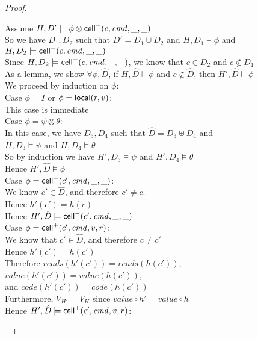 \begin{proof}
  \begin{tabbedproof}
    \oo Assume $H, D' \models \phi \otimes \mathsf{cell}^{-}({c}, {\mathit{cmd}}, {\_}, {\_})$. \\
    \ooo So we have $D_1, D_2$ such that $D' = D_1 \uplus D_2$ and $H, D_1 \models \phi$ and $H, D_2 \models \mathsf{cell}^{-}({c}, {\mathit{cmd}}, {\_}, {\_})$ \\
    \ooo Since $H, D_2 \models \mathsf{cell}^{-}({c}, {\mathit{cmd}}, {\_}, {\_})$, we know that $c \in D_2$ and $c \not\in D_1$ \\
    \ooo As a lemma, we show $\forall \phi, \hat{D}$, if $H, \hat{D} \models \phi$ and $c \not \in \hat{D}$, then $H', \hat{D} \models \phi$ \\
    \ooo We proceed by induction on $\phi$: \\
    \oooo Case $\phi = I$ or $\phi = \mathsf{local}({r}, {v})$: \\
    \ooooo This case is immediate \\
    \oooo Case $\phi = \psi \otimes \theta$: \\
    \ooooo In this case, we have $D_3, D_4$ such that $\hat{D} = D_3 \uplus D_4$ and  \\
    \ooooox $H, D_3 \models \psi$ and $H, D_4 \models \theta$ \\
    \ooooo So by induction we have $H', D_3 \models \psi$ and $H', D_4 \models \theta$ \\
    \ooooo Hence $H', \hat{D} \models \phi$\\
    \oooo Case $\phi = \mathsf{cell}^{-}({c'}, {\mathit{cmd}}, {\_}, {\_})$: \\
    \ooooo We know $c' \in \hat{D}$, and therefore $c' \not= c$. \\
    \ooooo Hence $h'(c') = h(c)$ \\
    \ooooo Hence $H', \hat{D} \models \mathsf{cell}^{-}({c'}, {\mathit{cmd}}, {\_}, {\_})$ \\
    \oooo Case $\phi = \mathsf{cell}^{+}({c'}, {\mathit{cmd}}, {v}, {r})$: \\
    \ooooo We know that $c' \in \hat{D}$, and therefore $c \not= c'$ \\
    \ooooo Hence $h'(c') = h(c')$ \\
    \ooooo Therefore $\mathit{reads}(h'(c')) = \mathit{reads}(h(c'))$, $\mathit{value}(h'(c')) = \mathit{value}(h(c'))$, \\
    \oooox and $\mathit{code}(h'(c')) = \mathit{code}(h(c'))$ \\ 
    \ooooo Furthermore, $V_{H'} = V_H$ since $\mathit{value} \circ h' = \mathit{value} \circ h$\\
    \ooooo Hence $H', \hat{D} \models \mathsf{cell}^{+}({c'}, {\mathit{cmd}}, {v}, {r})$: \\

\end{tabbedproof}
\end{proof}
